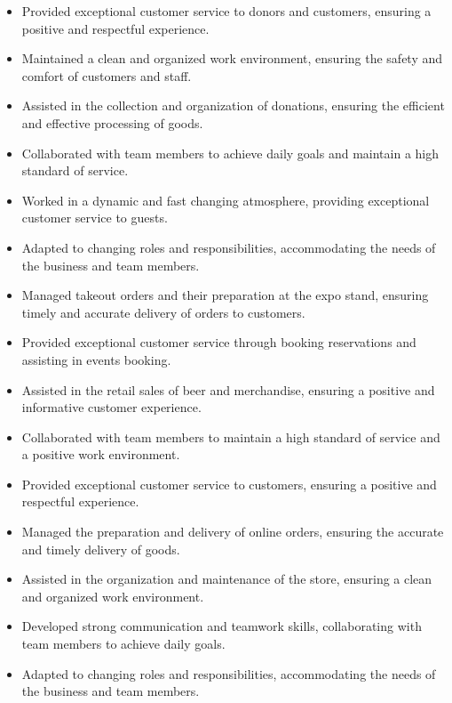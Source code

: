 \documentclass[9pt,a4paper,withhyper]{altacv}
\begin{document}
\newpage


\begin{itemize}
	\item Provided exceptional customer service to donors and customers, ensuring a positive and respectful experience.
	\item Maintained a clean and organized work environment, ensuring the safety and comfort of customers and staff.
	\item Assisted in the collection and organization of donations, ensuring the efficient and effective processing of goods.
	\item Collaborated with team members to achieve daily goals and maintain a high standard of service.
\end{itemize}
\divider

\begin{itemize}
	\item Worked in a dynamic and fast changing atmosphere, providing exceptional customer service to guests.
	\item Adapted to changing roles and responsibilities, accommodating the needs of the business and team members.
	\item Managed takeout orders and their preparation at the expo stand, ensuring timely and accurate delivery of orders to customers.
	\item Provided exceptional customer service through booking reservations and assisting in events booking.
	\item Assisted in the retail sales of beer and merchandise, ensuring a positive and informative customer experience.
	\item Collaborated with team members to maintain a high standard of service and a positive work environment.
\end{itemize}
\divider

\begin{itemize}
	\item Provided exceptional customer service to customers, ensuring a positive and respectful experience.
	\item Managed the preparation and delivery of online orders, ensuring the accurate and timely delivery of goods.
	\item Assisted in the organization and maintenance of the store, ensuring a clean and organized work environment.
	\item Developed strong communication and teamwork skills, collaborating with team members to achieve daily goals.
	\item Adapted to changing roles and responsibilities, accommodating the needs of the business and team members.
\end{itemize}
\end{document}
